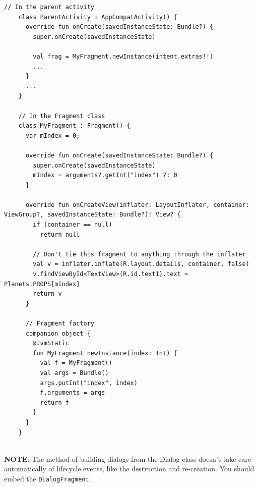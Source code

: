\begin{lstlisting}[title=Fragment implementation]
    // In the parent activity
    class ParentActivity : AppCompatActivity() {  
      override fun onCreate(savedInstanceState: Bundle?) {  
        super.onCreate(savedInstanceState)  
        
        val frag = MyFragment.newInstance(intent.extras!!)  
        ... 
      }
      ...
    } 
     
    // In the Fragment class
    class MyFragment : Fragment() {
      var mIndex = 0;  
      
      override fun onCreate(savedInstanceState: Bundle?) {  
        super.onCreate(savedInstanceState)  
        mIndex = arguments?.getInt("index") ?: 0  
      }
        
      override fun onCreateView(inflater: LayoutInflater, container: ViewGroup?, savedInstanceState: Bundle?): View? {  
        if (container == null)  
          return null  
          
        // Don't tie this fragment to anything through the inflater
        val v = inflater.inflate(R.layout.details, container, false) 
        v.findViewById<TextView>(R.id.text1).text = Planets.PROPS[mIndex]  
        return v  
      }  
      
      // Fragment factory
      companion object {  
        @JvmStatic
        fun MyFragment newInstance(index: Int) { 
          val f = MyFragment() 
          val args = Bundle()
          args.putInt("index", index) 
          f.arguments = args 
          return f 
        }
      }
    }
    
\end{lstlisting}

\textbf{NOTE}: The method of building dialogs from the Dialog class doesn't take care 
automatically of lifecycle events, like the destruction and re-creation. You should embed the 
\texttt{DialogFragment}. 



